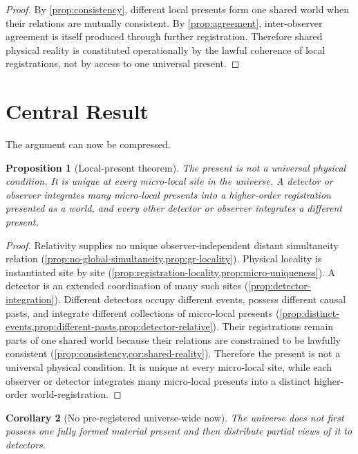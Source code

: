 \documentclass[12pt,onecolumn]{article}
\newtheorem{proposition}{Proposition}[section]
\newtheorem{corollary}[proposition]{Corollary}
\begin{document}
\begin{proof}
By \cref{prop:consistency}, different local presents form one shared world when their relations are mutually consistent. By \cref{prop:agreement}, inter-observer agreement is itself produced through further registration. Therefore shared physical reality is constituted operationally by the lawful coherence of local registrations, not by access to one universal present.
\end{proof}

\section{Central Result}

The argument can now be compressed.

\begin{proposition}[Local-present theorem]
\label{prop:local-present-theorem}
The present is not a universal physical condition. It is unique at every micro-local site in the universe. A detector or observer integrates many micro-local presents into a higher-order registration presented as a world, and every other detector or observer integrates a different present.
\end{proposition}

\begin{proof}
Relativity supplies no unique observer-independent distant simultaneity relation (\cref{prop:no-global-simultaneity,prop:gr-locality}). Physical locality is instantiated site by site (\cref{prop:registration-locality,prop:micro-uniqueness}). A detector is an extended coordination of many such sites (\cref{prop:detector-integration}). Different detectors occupy different events, possess different causal pasts, and integrate different collections of micro-local presents (\cref{prop:distinct-events,prop:different-pasts,prop:detector-relative}). Their registrations remain parts of one shared world because their relations are constrained to be lawfully consistent (\cref{prop:consistency,cor:shared-reality}). Therefore the present is not a universal physical condition. It is unique at every micro-local site, while each observer or detector integrates many micro-local presents into a distinct higher-order world-registration.
\end{proof}

\begin{corollary}[No pre-registered universe-wide now]
\label{cor:no-pre-registered-now}
The universe does not first possess one fully formed material present and then distribute partial views of it to detectors.
\end{corollary}
\end{document}
